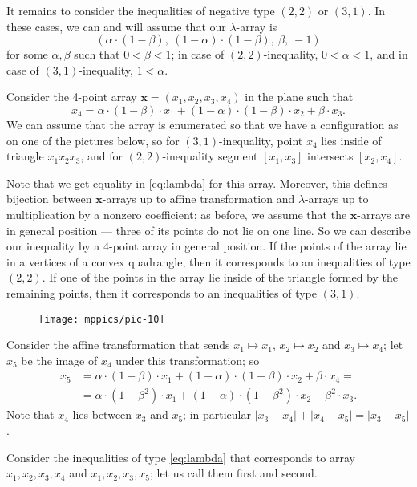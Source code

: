 \documentclass[a4paper,10pt]{article}
\begin{document}
It remains to consider the inequalities of negative type $(2,2)$ or $(3,1)$.
In these cases, we can and will assume that our $\lambda$-array is
\[(\alpha\cdot (1-\beta),\  (1-\alpha)\cdot(1-\beta),\  \beta,\ -1)\] 
for some $\alpha,\beta$ such that $0< \beta< 1$;
in case of $(2,2)$-inequality, $0< \alpha< 1$,
and
in case of $(3,1)$-inequality, $1< \alpha$.

Consider the 4-point array $\bm{x}=(x_1,x_2,x_3,x_4)$  in the plane such that 
\[x_4=\alpha\cdot (1-\beta)\cdot x_1+(1-\alpha)\cdot(1-\beta)\cdot x_2+\beta\cdot x_3.\]
We can assume that the array is enumerated so that we have a configuration as on one of the pictures below,
so for $(3,1)$-inequality, point $x_4$ lies inside of triangle $x_1x_2x_3$,
and for $(2,2)$-inequality segment $[x_1,x_3]$ intersects $[x_2,x_4]$.

Note that we get equality in \ref{eq:lambda} for this array.
Moreover, this defines bijection between $\bm{x}$-arrays up to affine transformation and $\lambda$-arrays up to multiplication by a nonzero coefficient;
as before, we assume that the $\bm{x}$-arrays are in general position --- three of its points do not lie on one line.
So we can describe our inequality by a 4-point array in general position.
If the points of the array lie in a vertices of a convex quadrangle,
then it corresponds to an inequalities of type $(2,2)$.
If one of the points in the array lie inside of the triangle formed by the remaining points, then it corresponds to an inequalities of type $(3,1)$.

\begin{figure}[ht!]
\vskip-0mm
\centering
\texttt{[image: mppics/pic-10]}
\vskip0mm
\end{figure}

Consider the affine transformation that sends $x_1\mapsto x_1$, $x_2\mapsto x_2$ and $x_3\mapsto x_4$;
let $x_5$ be the image of $x_4$ under this transformation; so \begin{align*}
x_5&=\alpha\cdot (1-\beta)\cdot x_1+(1-\alpha)\cdot(1-\beta)\cdot x_2+\beta\cdot x_4=
\\
&=\alpha\cdot (1-\beta^2)\cdot x_1+(1-\alpha)\cdot(1-\beta^2)\cdot x_2+\beta^2\cdot x_3.
\end{align*}
Note that $x_4$ lies between $x_3$ and $x_5$;
in particular $|x_3-x_4|+|x_4-x_5|=|x_3-x_5|$.

Consider the inequalities of type \ref{eq:lambda} that corresponds to array $x_1,x_2,x_3,x_4$ and $x_1,x_2,x_3,x_5$;
let us call them first and second.
\end{document}
